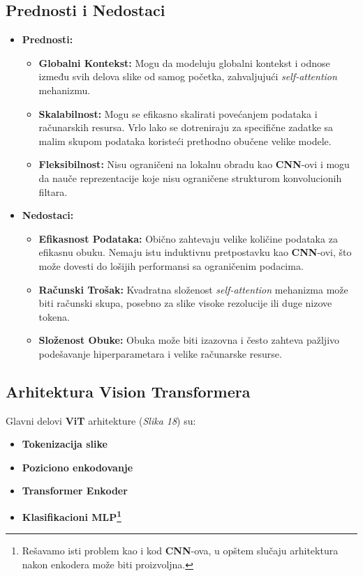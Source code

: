 \documentclass[12pt]{article}
\begin{document}
   \subsection{Prednosti i Nedostaci}
   \begin{itemize}
      \item \textbf{Prednosti:}
      \begin{itemize}
          \item \textbf{Globalni Kontekst:} Mogu da modeluju globalni kontekst 
          i odnose između svih delova slike od samog početka, zahvaljujući \textit{self-attention} 
          mehanizmu.
          \item \textbf{Skalabilnost:} Mogu se efikasno skalirati povećanjem podataka i računarskih 
          resursa. Vrlo lako se dotreniraju za specifične zadatke sa malim skupom podataka 
          koristeći prethodno obučene velike modele.
          \item \textbf{Fleksibilnost:} Nisu ograničeni na lokalnu obradu kao \textbf{CNN}-ovi i 
          mogu da nauče reprezentacije koje nisu ograničene strukturom konvolucionih filtara.
      \end{itemize}
      \item \textbf{Nedostaci:}
      \begin{itemize}
         \item \textbf{Efikasnost Podataka:} Obično zahtevaju velike količine 
         podataka za efikasnu obuku. Nemaju istu induktivnu pretpostavku kao \textbf{CNN}-ovi, 
         što može dovesti do lošijih performansi sa ograničenim podacima.
         \item \textbf{Računski Trošak:} Kvadratna složenost \textit{self-attention} mehanizma 
         može biti računski skupa, posebno za slike visoke rezolucije ili duge nizove tokena.
         \item \textbf{Složenost Obuke:} Obuka može biti izazovna i često zahteva pažljivo 
         podešavanje hiperparametara i velike računarske resurse.
      \end{itemize}
  \end{itemize}

  \newpage
  \subsection{Arhitektura Vision Transformera}
  Glavni delovi \textbf{ViT} arhitekture (\textit{Slika 18}) su:
   \begin{itemize}
         \item \textbf{Tokenizacija slike}
         \item \textbf{Poziciono enkodovanje}
         \item \textbf{Transformer Enkoder}
         \item \textbf{Klasifikacioni MLP\footnote{Rešavamo isti problem kao i kod \textbf{CNN}-ova, u opštem slučaju arhitektura nakon enkodera može biti proizvoljna.}}
   \end{itemize}
\end{document}
